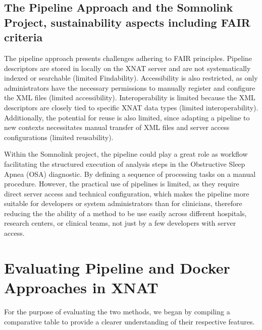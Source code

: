 


\subsection{The Pipeline Approach and the Somnolink Project, sustainability aspects including FAIR criteria}
The pipeline approach presents challenges adhering to FAIR principles.
Pipeline descriptors are stored in locally on the XNAT server and are not systematically indexed or searchable (limited Findability).
 Accessibility is also restricted, as only administrators have the necessary permissions to manually register and configure the XML files (limited accessibility).
 Interoperability is limited because the XML descriptors are closely tied to specific XNAT data types (limited interoperability). Additionally, the potential for reuse is also limited, since adapting a pipeline to new contexts necessitates manual transfer of XML files and server access configurations (limited reusability).
 
Within the Somnolink project, the pipeline could play a great role as workflow  facilitating the structured execution of analysis steps in the Obstructive Sleep Apnea (OSA) diagnostic. By defining a sequence of processing tasks on a manual procedure. However, the practical use of pipelines is limited, as they require direct server access and technical configuration, which makes the pipeline more suitable for developers or system administrators than for clinicians, therefore reducing the the ability of a method to be use easily across different hospitals, research centers, or clinical teams, not just by a few developers with server access.








\section{Evaluating Pipeline and Docker Approaches in XNAT}

For the purpose of evaluating the two methods, we began by compiling a comparative table to provide a clearer understanding of their respective features.

